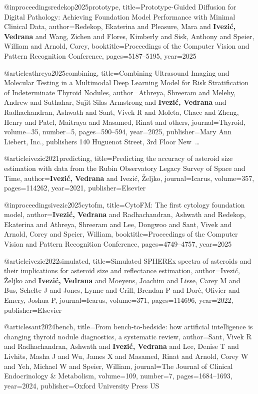 @inproceedings{redekop2025prototype,
  title={Prototype-Guided Diffusion for Digital Pathology: Achieving Foundation Model Performance with Minimal Clinical Data},
  author={Redekop, Ekaterina and Pleasure, Mara and {\textbf{Ivezi{\'c}, Vedrana}} and Wang, Zichen and Flores, Kimberly and Sisk, Anthony and Speier, William and Arnold, Corey},
  booktitle={Proceedings of the Computer Vision and Pattern Recognition Conference},
  pages={5187--5195},
  year={2025}
}

@article{athreya2025combining,
  title={Combining Ultrasound Imaging and Molecular Testing in a Multimodal Deep Learning Model for Risk Stratification of Indeterminate Thyroid Nodules},
  author={Athreya, Shreeram and Melehy, Andrew and Suthahar, Sujit Silas Armstrong and {\textbf{Ivezi{\'c}, Vedrana}} and Radhachandran, Ashwath and Sant, Vivek R and Moleta, Chace and Zheng, Henry and Patel, Maitraya and Masamed, Rinat and others},
  journal={Thyroid},
  volume={35},
  number={5},
  pages={590--594},
  year={2025},
  publisher={Mary Ann Liebert, Inc., publishers 140 Huguenot Street, 3rd Floor New~…}
}

@article{ivezic2021predicting,
  title={Predicting the accuracy of asteroid size estimation with data from the Rubin Observatory Legacy Survey of Space and Time},
  author={{\textbf{Ivezi{\'c}, Vedrana}} and Ivezi{\'c}, {\v{Z}}eljko},
  journal={Icarus},
  volume={357},
  pages={114262},
  year={2021},
  publisher={Elsevier}
}

@inproceedings{ivezic2025cytofm,
  title={CytoFM: The first cytology foundation model},
  author={{\textbf{Ivezi{\'c}, Vedrana}} and Radhachandran, Ashwath and Redekop, Ekaterina and Athreya, Shreeram and Lee, Dongwoo and Sant, Vivek and Arnold, Corey and Speier, William},
  booktitle={Proceedings of the Computer Vision and Pattern Recognition Conference},
  pages={4749--4757},
  year={2025}
}

@article{ivezic2022simulated,
  title={Simulated SPHEREx spectra of asteroids and their implications for asteroid size and reflectance estimation},
  author={Ivezi{\'c}, {\v{Z}}eljko and {\textbf{Ivezi{\'c}, Vedrana}} and Moeyens, Joachim and Lisse, Carey M and Bus, Schelte J and Jones, Lynne and Crill, Brendan P and Dor{\'e}, Olivier and Emery, Joshua P},
  journal={Icarus},
  volume={371},
  pages={114696},
  year={2022},
  publisher={Elsevier}
}

@article{sant2024bench,
  title={From bench-to-bedside: how artificial intelligence is changing thyroid nodule diagnostics, a systematic review},
  author={Sant, Vivek R and Radhachandran, Ashwath and {\textbf{Ivezi{\'c}, Vedrana}} and Lee, Denise T and Livhits, Masha J and Wu, James X and Masamed, Rinat and Arnold, Corey W and Yeh, Michael W and Speier, William},
  journal={The Journal of Clinical Endocrinology \& Metabolism},
  volume={109},
  number={7},
  pages={1684--1693},
  year={2024},
  publisher={Oxford University Press US}
}

